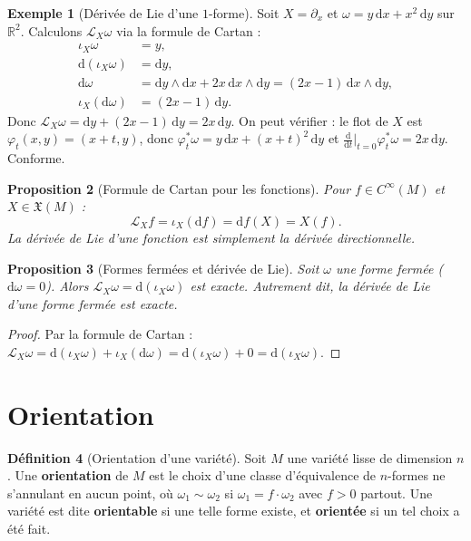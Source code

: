 \documentclass[12pt,a4paper,openany]{book}
\theoremstyle{definition}
\newtheorem{definition}{Définition}[chapter]
\newtheorem{exemple}[definition]{Exemple}
\theoremstyle{plain}
\newtheorem{proposition}[definition]{Proposition}
\theoremstyle{remark}
\newcommand{\R}{\mathbb{R}}
\newcommand{\dd}{\mathrm{d}}
\begin{document}
\begin{exemple}[Dérivée de Lie d'une $1$-forme]\label{ex:lie-1-forme}
Soit $X = \partial_x$ et $\omega = y\,\dd x + x^2\,\dd y$ sur $\R^2$.
Calculons $\mathcal{L}_X \omega$ via la formule de Cartan :
\begin{align*}
  \iota_X \omega &= y, \\
  \dd(\iota_X \omega) &= \dd y, \\
  \dd\omega &= \dd y \wedge \dd x + 2x\,\dd x \wedge \dd y
    = (2x - 1)\,\dd x \wedge \dd y, \\
  \iota_X(\dd\omega) &= (2x-1)\,\dd y.
\end{align*}
Donc $\mathcal{L}_X \omega = \dd y + (2x-1)\,\dd y = 2x\,\dd y$.
On peut vérifier : le flot de $X$ est $\varphi_t(x,y) = (x+t, y)$, donc
$\varphi_t^*\omega = y\,\dd x + (x+t)^2\,\dd y$ et
$\frac{\dd}{\dd t}\big|_{t=0} \varphi_t^*\omega = 2x\,\dd y$. Conforme.
\end{exemple}

\begin{proposition}[Formule de Cartan pour les fonctions]%
\label{prop:cartan-fonctions}
Pour $f \in C^\infty(M)$ et $X \in \mathfrak{X}(M)$ :
\[
  \mathcal{L}_X f = \iota_X(\dd f) = \dd f(X) = X(f).
\]
La dérivée de Lie d'une fonction est simplement la dérivée directionnelle.
\end{proposition}

\begin{proposition}[Formes fermées et dérivée de Lie]%
\label{prop:fermee-lie}
Soit $\omega$ une forme fermée ($\dd\omega = 0$). Alors
$\mathcal{L}_X \omega = \dd(\iota_X \omega)$ est exacte. Autrement dit,
la dérivée de Lie d'une forme fermée est exacte.
\end{proposition}

\begin{proof}
Par la formule de Cartan :
$\mathcal{L}_X \omega = \dd(\iota_X \omega) + \iota_X(\dd\omega)
= \dd(\iota_X \omega) + 0 = \dd(\iota_X \omega)$.
\end{proof}

\section{Orientation}\label{sec:orientation}

\begin{definition}[Orientation d'une variété]\label{def:orientation}%
Soit $M$ une variété lisse de dimension $n$. Une \textbf{orientation} de
$M$ est le choix d'une classe d'équivalence de $n$-formes ne s'annulant
en aucun point, où $\omega_1 \sim \omega_2$ si
$\omega_1 = f \cdot \omega_2$ avec $f > 0$ partout. Une variété est dite
\textbf{orientable} si une telle forme existe, et \textbf{orientée} si
un tel choix a été fait.
\end{definition}
\end{document}
